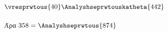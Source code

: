 \documentclass[a4paper]{article}
\begin{document}
$ \vresprwtous{40}%
\Analyshseprwtouskatheta{442} $\\\\
Άρα $ 358=\Analyshseprwtous{874}$
\end{document}

